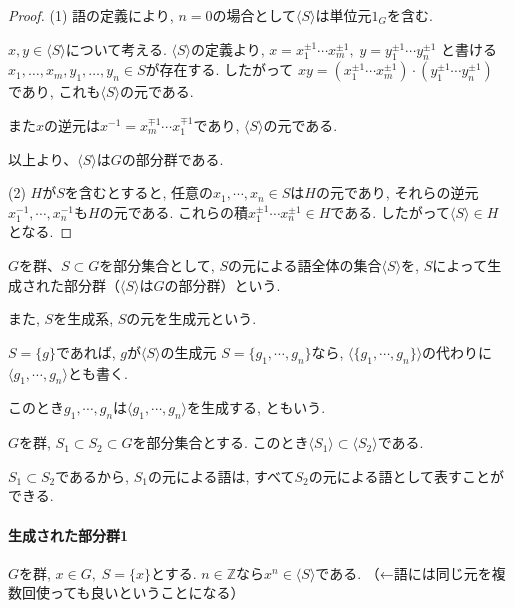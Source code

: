 \begin{proof}
  (1) 語の定義により, $n=0$の場合として$\langle S \rangle$は単位元$1_G$を含む.

  $x,y \in \langle S \rangle$について考える.
  $\langle S \rangle$の定義より,
  $ x=x_1^{\pm 1} \cdots x_m^{\pm 1}, \; y=y_1^{\pm 1} \cdots y_n^{\pm 1} $
  と書ける $x_1,\dots, x_m,y_1, \dots, y_n \in S $が存在する. 
  したがって
  $xy =(x_1^{\pm 1} \cdots x_m^{\pm 1})\cdot(y_1^{\pm 1} \cdots y_n^{\pm 1})$
  であり, これも$\langle S \rangle$の元である.

   また$x$の逆元は$x^{-1}=x_m^{\mp 1}\cdots x_1^{\mp 1}$であり,
   $\langle S \rangle$の元である.

   以上より、$\langle S \rangle$は$G$の部分群である.

  (2) $H$が$S$を含むとすると, 任意の$x_1, \cdots, x_n \in S$は$H$の元であり,
  それらの逆元$x_1^{-1}, \cdots, x_n^{-1}$も$H$の元である.
  これらの積$x_1^{\pm 1} \cdots x_n^{\pm 1} \in H$である.
  したがって$\langle S \rangle \in H$となる.
\end{proof}

$G$を群、$S\subset G$を部分集合として,
$S$の元による語全体の集合$\langle S \rangle$を,
$S$によって生成された部分群（$\langle S \rangle$は$G$の部分群）という.

また, $S$を生成系, $S$の元を生成元という.\newline

$S=\{g\}$であれば, $g$が$\langle S \rangle$の生成元
$S=\{g_1,\cdots,g_n\}$なら,
$\langle \{g_1,\cdots,g_n\} \rangle$の代わりに
$\langle g_1,\cdots,g_n\rangle $とも書く.

このとき$g_1,\cdots,g_n$は$\langle g_1,\cdots,g_n\rangle$を生成する,
ともいう.\\

\begin{tcolorbox}
	\begin{prp*}
		$G$を群, $S_1 \subset S_2 \subset G$を部分集合とする. 
		このとき$\langle S_1 \rangle \subset \langle S_2 \rangle $である.
	\end{prp*}
\end{tcolorbox}

$S_1 \subset S_2 $であるから, $S_1$の元による語は, 
すべて$S_2$の元による語として表すことができる.

\paragraph*{生成された部分群1}
$G$を群, $x \in G, \; S=\{x\}$とする.
$n \in \mathbb{Z}$なら$x^n \in \langle S \rangle$である.
（←語には同じ元を複数回使っても良いということになる）

